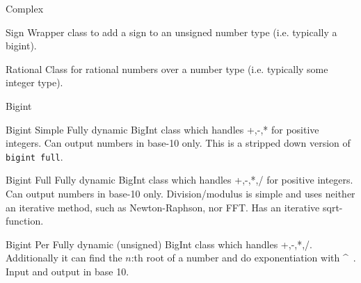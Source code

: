 
\begin{algorithm}{Complex}
\end{algorithm}

\begin{algorithm}{Sign}
\desc
Wrapper class to add a sign to an unsigned number type (i.e. typically
a bigint).
\end{algorithm}

\begin{algorithm}{Rational}
\desc
Class for rational numbers over a number type (i.e. typically some
integer type).
\end{algorithm}

\begin{algorithm}{Bigint}
\end{algorithm}

\begin{algorithm}{Bigint Simple}
\desc
Fully dynamic BigInt class which handles +,-,* for
positive integers. Can output numbers in base-10 only. This is a stripped
down version of {\tt bigint full}.
\end{algorithm}

\begin{algorithm}{Bigint Full}
\desc
Fully dynamic BigInt class which handles +,-,*,/ for
positive integers. Can output numbers in base-10 only. Division/modulus is
simple and uses neither an iterative method, such as Newton-Raphson,
nor FFT. Has an iterative sqrt-function.
\end{algorithm}

\begin{algorithm}{Bigint Per}
\desc
Fully dynamic (unsigned) BigInt class which handles
+,-,*,/. Additionally it can find the $n$:th root of a number and do
exponentiation with \^~. Input and output in base 10.
\end{algorithm}
